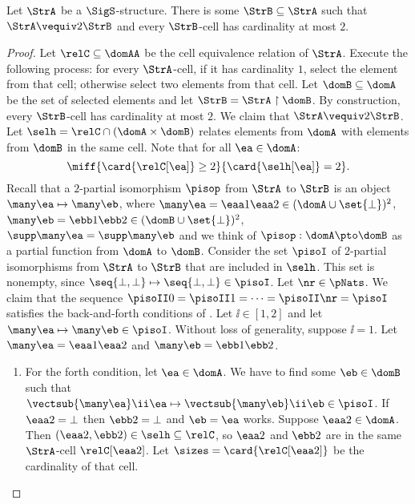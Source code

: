 \begin{lemma}\label{lem:twovar-cell-2}
Let $\StrA$ be a $\SigS$-structure.
There is some $\StrB \subseteq \StrA$ such that
$\StrA \vequiv2 \StrB$ and every
$\StrB$-cell has cardinality at most $2$.
\end{lemma}
\begin{proof}
Let $\relC \subseteq \domAA$ be the cell equivalence relation of $\StrA$.
Execute the following process: for every $\StrA$-cell, if it has cardinality
$1$, select the element from that cell; otherwise select two elements from that
cell.
Let $\domB \subseteq \domA$ be the set of selected elements and let
$\StrB = \StrA \restriction \domB$.
By construction, every $\StrB$-cell has cardinality at most $2$.
We claim that $\StrA \vequiv2 \StrB$.
Let $\selh = \relC \cap (\domA \times \domB)$ relates elements from $\domA$ with
elements from $\domB$ in the same cell.
Note that for all $\ea \in \domA$:
\begin{equation}\label{eq:twovar-cell-2}
  \miff{
  \card{\relC[\ea]} \geq 2}{
  \card{\selh[\ea]} = 2}.
\end{equation}
Recall that a $2$-partial isomorphism $\pisop$ from $\StrA$ to $\StrB$ is an
object $\many\ea \mapsto \many\eb$, where
$\many\ea = \eaa1\eaa2 \in (\domA \cup \set{\bot})^2$,
$\many\eb = \ebb1\ebb2 \in (\domB \cup \set{\bot})^2$,
$\supp\many\ea = \supp\many\eb$
and we think of $\pisop: \domA \pto \domB$ as a partial function from $\domA$
to $\domB$.
Consider the set $\pisoI$ of $2$-partial isomorphisms from
$\StrA$ to $\StrB$ that are included in $\selh$.
This set is nonempty, since $\seq{\bot,\bot} \mapsto \seq{\bot,\bot} \in
\pisoI$.
Let $\nr \in \pNats$. We claim that the sequence
$\pisoII0 = \pisoII1 = \dots = \pisoII\nr = \pisoI$
satisfies the back-and-forth conditions of .
Let $\ii \in [1,2]$ and let $\many\ea \mapsto \many\eb \in \pisoI$.
Without loss of generality, suppose $\ii = 1$.
Let $\many\ea = \eaa1\eaa2$ and $\many\eb = \ebb1\ebb2$.
\begin{enumerate}
  \item For the forth condition, let $\ea \in \domA$. 
  We have to find some $\eb \in \domB$ such that
  $\vectsub{\many\ea}\ii\ea \mapsto \vectsub{\many\eb}\ii\eb \in \pisoI$.
  If $\eaa2 = \bot$ then $\ebb2 = \bot$ and $\eb = \ea$ works.
  Suppose $\eaa2 \in \domA$. Then $(\eaa2,\ebb2) \in \selh \subseteq \relC$, so
  $\eaa2$ and $\ebb2$ are in the same $\StrA$-cell $\relC[\eaa2]$.
  Let $\sizes = \card{\relC[\eaa2]}$ be the cardinality of that cell.
 

\end{enumerate}
\end{proof}
